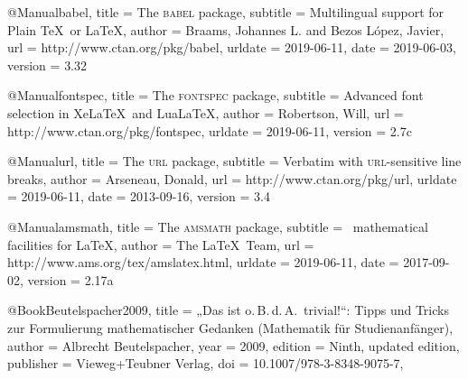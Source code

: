 \documentclass[german,version-2020-11]{uzl-thesis}
\begin{document}
\begin{bibtex-entries}
@Manual{babel,
  title =        {The \textsc{babel} package},
  subtitle =     {Multilingual support for Plain \TeX\ or \LaTeX},
  author =       {Braams, Johannes L. and Bezos López, Javier},
  url =          {http://www.ctan.org/pkg/babel},
  urldate =      {2019-06-11},
  date =         {2019-06-03},
  version =      {3.32}
}

@Manual{fontspec,
  title =        {The \textsc{fontspec} package},
  subtitle =     {Advanced font selection in Xe\LaTeX\ and Lua\LaTeX},
  author =       {Robertson, Will},
  url =          {http://www.ctan.org/pkg/fontspec},
  urldate =      {2019-06-11},
  version =      {2.7c}
}

@Manual{url,
  title =        {The \textsc{url} package},
  subtitle =     {Verbatim with \textsc{url}-sensitive line breaks},
  author =       {Arseneau, Donald},
  url =          {http://www.ctan.org/pkg/url},
  urldate =      {2019-06-11},
  date =         {2013-09-16},
  version =      {3.4}
}

@Manual{amsmath,
  title =        {The \textsc{amsmath} package},
  subtitle =     {\AmS\ mathematical facilities for \LaTeX},
  author =       {{The \LaTeX\ Team}},
  url =          {http://www.ams.org/tex/amslatex.html},
  urldate =      {2019-06-11}, 
  date =         {2017-09-02},
  version =      {2.17a}
}

@Book{Beutelspacher2009,
  title =        {„Das ist o.\,B.\,d.\,A.\ trivial!“: Tipps und Tricks zur
                  Formulierung mathematischer Gedanken (Mathematik für
                  Studienanfänger)},
  author =       {Albrecht Beutelspacher},
  year =         {2009},
  edition =      {Ninth, updated edition},
  publisher =    {Vieweg+Teubner Verlag},
  doi =          {10.1007/978-3-8348-9075-7},
}

\end{bibtex-entries}



%
%
%
%
\end{document}
